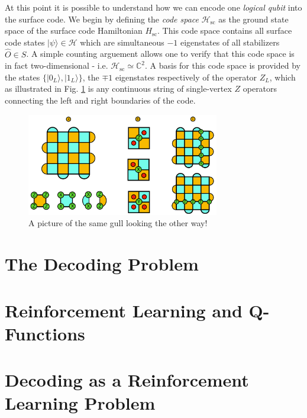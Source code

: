 \documentclass[onecolumn,preprintnumbers,amsmath,amssymb,notitlepage,nofootinbib,longbibliography,superscriptaddress]{revtex4-1}
\begin{document}
    At this point it is possible to understand how we can encode one \textit{logical qubit} into the surface code. We begin by defining the \textit{code space} $\mathcal{H}_{\mathrm{sc}}$ as the ground state space of the surface code Hamiltonian $H_{\mathrm{sc}}$. This code space contains all surface code states $|\psi\rangle \in \mathcal{H}$ which are simultaneous $-1$ eigenstates of all stabilizers $\hat{O} \in S$. A simple counting arguement allows one to verify that this code space is in fact two-dimensional - i.e. $\mathcal{H}_{\mathrm{sc}} \simeq \mathbb{C}^2$. A basis for this code space is provided by the states $\{ |0_L\rangle, |1_L\rangle \}$, the  $\mp 1$ eigenstates respectively of the operator $Z_L$, which as illustrated in Fig. \ref{f:surface_code} is any continuous string of single-vertex $Z$ operators connecting the left and right boundaries of the code.


    \begin{figure}
      \centering
          \includegraphics[width=0.75\textwidth]{surface_code.pdf}
      \caption{A picture of the same gull
               looking the other way!}\label{f:surface_code}
    \end{figure}


\section{The Decoding Problem}\label{s:the_decoding_problem}
\section{Reinforcement Learning and Q-Functions}\label{s:reinforcement_learning}
\section{Decoding as a Reinforcement Learning Problem}\label{s:decoding_as_rl}
\end{document}
